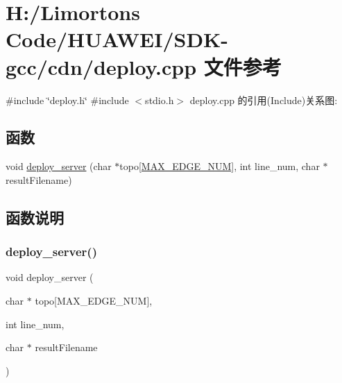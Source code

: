 \hypertarget{_s_d_k-gcc_2cdn_2deploy_8cpp}{}\section{H\+:/\+Limorton\textquotesingle{}s Code/\+H\+U\+A\+W\+E\+I/\+S\+D\+K-\/gcc/cdn/deploy.cpp 文件参考}
\label{_s_d_k-gcc_2cdn_2deploy_8cpp}
{\ttfamily \#include \char`\"{}deploy.\+h\char`\"{}}\newline
{\ttfamily \#include $<$stdio.\+h$>$}\newline
deploy.\+cpp 的引用(Include)关系图\+:
\subsection*{函数}
\begin{DoxyCompactItemize}
\item 
void \hyperlink{_s_d_k-gcc_2cdn_2deploy_8cpp_aca1f7f7c54e5bb1e7091a61f21052fb0}{deploy\+\_\+server} (char $\ast$topo\mbox{[}\hyperlink{_s_d_k-gcc_2cdn_2lib_2lib__io_8h_a5e17bfd66025e3f6293a10a5b507b3f6}{M\+A\+X\+\_\+\+E\+D\+G\+E\+\_\+\+N\+UM}\mbox{]}, int line\+\_\+num, char $\ast$result\+Filename)
\end{DoxyCompactItemize}


\subsection{函数说明}
\mbox{\label{_s_d_k-gcc_2cdn_2deploy_8cpp_aca1f7f7c54e5bb1e7091a61f21052fb0}} 
\subsubsection{\texorpdfstring{deploy\+\_\+server()}{deploy\_server()}}
{\footnotesize\ttfamily void deploy\+\_\+server (\begin{DoxyParamCaption}\item[{char $\ast$}]{topo\mbox{[}\+M\+A\+X\+\_\+\+E\+D\+G\+E\+\_\+\+N\+U\+M\mbox{]},  }\item[{int}]{line\+\_\+num,  }\item[{char $\ast$}]{result\+Filename }\end{DoxyParamCaption})}

